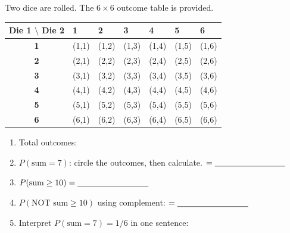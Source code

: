 \documentclass[10pt]{article}
\begin{document}
\begin{practicebox}
\small Two dice are rolled. The $6 \times 6$ outcome table is provided.

\vspace{4pt}
\renewcommand{\arraystretch}{1.3}
\begin{tabularx}{\linewidth}{@{} c | *{6}{>{\centering\arraybackslash}X} @{}}
\textbf{Die 1 $\setminus$ Die 2} & \textbf{1} & \textbf{2} & \textbf{3} & \textbf{4} & \textbf{5} & \textbf{6} \\
\hline
\textbf{1} & (1,1) & (1,2) & (1,3) & (1,4) & (1,5) & (1,6) \\
\textbf{2} & (2,1) & (2,2) & (2,3) & (2,4) & (2,5) & (2,6) \\
\textbf{3} & (3,1) & (3,2) & (3,3) & (3,4) & (3,5) & (3,6) \\
\textbf{4} & (4,1) & (4,2) & (4,3) & (4,4) & (4,5) & (4,6) \\
\textbf{5} & (5,1) & (5,2) & (5,3) & (5,4) & (5,5) & (5,6) \\
\textbf{6} & (6,1) & (6,2) & (6,3) & (6,4) & (6,5) & (6,6) \\
\end{tabularx}

\vspace{6pt}
\begin{enumerate}[leftmargin=1.5em, itemsep=8pt]
  \item Total outcomes: \blank{2cm}
  \item $P(\text{sum} = 7)$: circle the outcomes, then calculate. $= \blank{3cm}$
  \item $P(\text{sum} \geq 10) = \blank{3cm}$
  \item $P(\text{NOT sum} \geq 10)$ using complement: $= \blank{3cm}$
  \item Interpret $P(\text{sum} = 7) = 1/6$ in one sentence:
        \writeline
\end{enumerate}
\end{practicebox}
\end{document}
